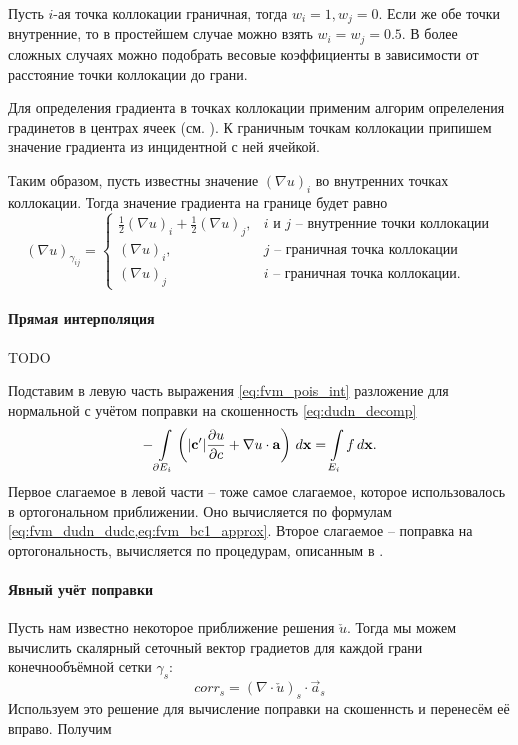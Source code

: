 Пусть $i$-ая точка коллокации граничная, тогда $w_i = 1, w_j = 0$.
Если же обе точки внутренние, то в простейшем случае можно взять $w_i = w_j = 0.5$.
В более сложных случаях можно подобрать весовые коэффициенты в зависимости от расстояние точки коллокации до грани.

Для определения градиента в точках коллокации применим алгорим опрелеления 
градинетов в центрах ячеек (см. ).
К граничным точкам коллокации припишем значение градиента
из инцидентной с ней ячейкой.

Таким образом, пусть известны значение $(\nabla u)_i$ во внутренних точках коллокации. Тогда
значение градиента на границе будет равно
\begin{equation*}
\left(\nabla u\right)_{\gamma_{ij}} =
\begin{cases}
\frac12 \left(\nabla u\right)_i + \frac12 \left(\nabla u\right)_j, & \text{$i$ и $j$ -- внутренние точки коллокации}\\
\left(\nabla u\right)_i, & \text{$j$ -- граничная точка коллокации}\\
\left(\nabla u\right)_j & \text{$i$ -- граничная точка коллокации}.
\end{cases}
\end{equation*}

\paragraph{Прямая интерполяция}
TODO

\label{sec:ortho_correction_assembly}
Подставим в левую часть выражения \cref{eq:fvm_pois_int}
разложение для нормальной с учётом поправки на скошенность \cref{eq:dudn_decomp}
\begin{equation*}
-\arint{\left(|\vec c'| \dfr{u}{c} + \nabla u \cdot \vec a\right)}{\partial E_i}{\vec x} = \arint{f}{E_i}{\vec x}.
\end{equation*}
Первое слагаемое в левой части -- тоже самое слагаемое, которое
использовалось в ортогональном приближении. Оно вычисляется по формулам
\cref{eq:fvm_dudn_dudc,eq:fvm_bc1_approx}.
Второе слагаемое -- поправка на ортогональность, вычисляется по процедурам,
описанным в .

\paragraph{Явный учёт поправки}
Пусть нам известно некоторое приближение решения $\check u$.
Тогда мы можем вычислить скалярный сеточный вектор градиетов для каждой
грани конечнообъёмной сетки $\gamma_s$:
\begin{equation}
\label{eq:fvm_corr_vec}
{corr}_s = \left(\nabla \cdot \check u\right)_{s} \cdot \vec a_s
\end{equation}
Используем это решение для вычисление поправки на скошеннсть и
перенесём её вправо. Получим

